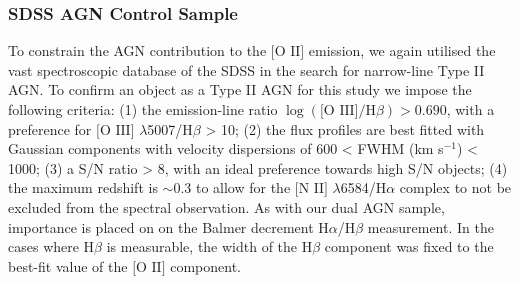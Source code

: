 \subsubsection{SDSS AGN Control Sample}

To constrain the AGN contribution to the $\text{[O II]}$ emission, we again utilised the vast spectroscopic database of the SDSS in the search for narrow-line Type II AGN. To confirm an object as a Type II AGN for this study we impose the following criteria: (1) the emission-line ratio $\log(\text{[O III]}/\text{H}\beta)>{0.690}$, with a preference for $\text{[O III]}$ $\lambda$5007/$\text{H}\beta$ > 10; (2) the flux profiles are best fitted with Gaussian components with velocity dispersions of 600 < FWHM (km s$^{-1}$) < 1000; (3) a S/N ratio > 8, with an ideal preference towards high S/N objects; (4) the maximum redshift is $\sim{0.3}$ to allow for the $\text{[N II]}$ $\lambda$6584/$\text{H}\alpha$ complex to not be excluded from the spectral observation. As with our dual AGN sample, importance is placed on on the Balmer decrement $\text{H}\alpha$/$\text{H}\beta$ measurement. In the cases where $\text{H}\beta$ is measurable, the width of the $\text{H}\beta$ component was fixed to the best-fit value of the $\text{[O II]}$ component.
  
